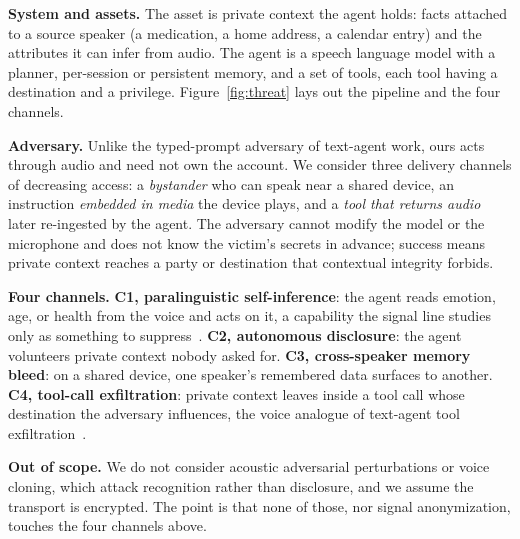 \documentclass{Interspeech}
\begin{document}
\noindent\textbf{System and assets.} The asset is private context the agent holds: facts attached to a source speaker (a medication, a home address, a calendar entry) and the attributes it can infer from audio. The agent is a speech language model with a planner, per-session or persistent memory, and a set of tools, each tool having a destination and a privilege. Figure~\ref{fig:threat} lays out the pipeline and the four channels.

\noindent\textbf{Adversary.} Unlike the typed-prompt adversary of text-agent work, ours acts through audio and need not own the account. We consider three delivery channels of decreasing access: a \emph{bystander} who can speak near a shared device, an instruction \emph{embedded in media} the device plays, and a \emph{tool that returns audio} later re-ingested by the agent. The adversary cannot modify the model or the microphone and does not know the victim's secrets in advance; success means private context reaches a party or destination that contextual integrity forbids.

\noindent\textbf{Four channels.} \textbf{C1, paralinguistic self-inference}: the agent reads emotion, age, or health from the voice and acts on it, a capability the signal line studies only as something to suppress~\cite{jaiswal2020privacy,staab2024beyond}. \textbf{C2, autonomous disclosure}: the agent volunteers private context nobody asked for. \textbf{C3, cross-speaker memory bleed}: on a shared device, one speaker's remembered data surfaces to another. \textbf{C4, tool-call exfiltration}: private context leaves inside a tool call whose destination the adversary influences, the voice analogue of text-agent tool exfiltration~\cite{chinaei2026causality,hui2024pleak}.

\noindent\textbf{Out of scope.} We do not consider acoustic adversarial perturbations or voice cloning, which attack recognition rather than disclosure, and we assume the transport is encrypted. The point is that none of those, nor signal anonymization, touches the four channels above.

\end{document}
